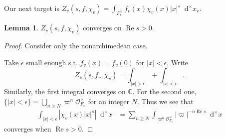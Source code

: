 \documentclass{article}
\theoremstyle{definition}
\newtheorem{lemma}{Lemma}[section]
\theoremstyle{remark}
\renewcommand{\Re}{\mathop{\mathrm{Re}}}
\newcommand{\C}{\mathbb{C}}
\newcommand{\dxm}{\mathop{}\!\mathrm{d}^{\times}x}
\renewcommand{\O}{\mathcal{O}}
\begin{document}
Our next target is $Z_v(s, f, \chi_v) = \int_{F_v^\times}f_v(x)\chi_v(x)|x|^s\dxm_v$.
\begin{lemma}
    $Z_v(s, f, \chi_v)$ converges on $\Re s > 0$.
\end{lemma}
\begin{proof}
    Consider only the nonarchimedean case.
    
    Take $\epsilon$ small enough s.t. $f_v(x) = f_v(0)$ for $|x| < \epsilon$.
    Write \[Z_v(s, f_v, \chi_v) = \int_{|x| > \epsilon} + \int_{|x| < \epsilon}.\]
    Similarly, the first integral converges on $\C$. For the second one, $\{|x| < \epsilon\} = \bigcup_{n\ge N}\varpi^n\O_{F_v}^\times$ for an integer $N$. Thus we see that\begin{align*}
        \int_{|x| < \epsilon} \left|\chi_v(x)|x|^s\right|\dxm &= \sum_{n\ge N} \int_{\varpi^n\O_{F_v}^{\times}} |\varpi|^{-n\Re s}\dxm
    \end{align*}
    converges when $\Re s > 0$.
\end{proof}
\end{document}
